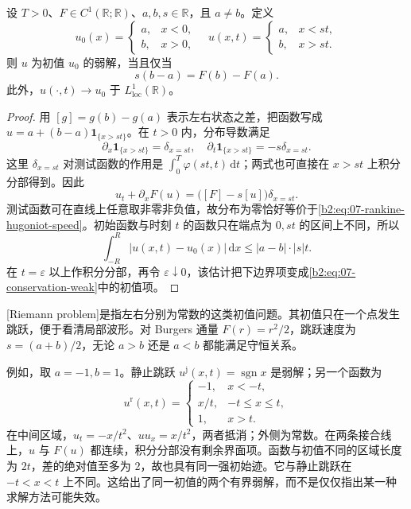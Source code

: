 \begin{proposition}\label{b2:prop:07-rankine-hugoniot}
设 \(T>0\)、\(F\in C^1(\mathbb R;\mathbb R)\)、\(a,b,s\in\mathbb R\)，且 \(a\ne b\)。定义
\[
 u_0(x)=\begin{cases}a,&x<0,\\b,&x>0,\end{cases}
 \quad
 u(x,t)=\begin{cases}a,&x<st,\\b,&x>st.\end{cases}
\]
则 \(u\) 为初值 \(u_0\) 的弱解，当且仅当
\begin{equation}\label{b2:eq:07-rankine-hugoniot-speed}
 s(b-a)=F(b)-F(a).
\end{equation}
此外，\(u(\cdot,t)\to u_0\) 于 \(L^1_{\mathrm{loc}}(\mathbb R)\)。
\end{proposition}
\begin{proof}
用 \([g]=g(b)-g(a)\) 表示左右状态之差，把函数写成
\(u=a+(b-a)\mathbf1_{\{x>st\}}\)。在 \(t>0\) 内，分布导数满足
\[
 \partial_x\mathbf1_{\{x>st\}}=\delta_{x=st},
 \quad
 \partial_t\mathbf1_{\{x>st\}}=-s\delta_{x=st}.
\]
这里 \(\delta_{x=st}\) 对测试函数的作用是 \(\int_0^T\varphi(st,t)\,\mathrm dt\)；两式也可直接在 \(x>st\) 上积分分部得到。因此
\[
 u_t+\partial_xF(u)=\bigl([F]-s[u]\bigr)\delta_{x=st}.
\]
测试函数可在直线上任意取非零非负值，故分布为零恰好等价于\eqref{b2:eq:07-rankine-hugoniot-speed}。初始函数与时刻 \(t\) 的函数只在端点为 \(0,st\) 的区间上不同，所以
\[
 \int_{-R}^R|u(x,t)-u_0(x)|\,\mathrm dx
 \leq |a-b|\cdot|s|t.
\]
在 \(t=\varepsilon\) 以上作积分分部，再令 \(\varepsilon\downarrow0\)，该估计把下边界项变成\eqref{b2:eq:07-conservation-weak}中的初值项。
\end{proof}

[Riemann problem]是指左右分别为常数的这类初值问题。其初值只在一个点发生跳跃，便于看清局部波形。对 Burgers 通量 \(F(r)=r^2/2\)，跳跃速度为
\(s=(a+b)/2\)，无论 \(a>b\) 还是 \(a<b\) 都能满足守恒关系。

例如，取 \(a=-1,b=1\)。静止跳跃
\(u^{\mathrm j}(x,t)=\operatorname{sgn}x\) 是弱解；另一个函数为
\begin{equation}\label{b2:eq:07-burgers-nonunique-fan}
 u^{\mathrm r}(x,t)=
 \begin{cases}
 -1,&x<-t,\\
 x/t,&-t\leq x\leq t,\\
 1,&x>t.
 \end{cases}
\end{equation}
在中间区域，\(u_t=-x/t^2\)、\(u u_x=x/t^2\)，两者抵消；外侧为常数。在两条接合线上，\(u\) 与 \(F(u)\) 都连续，积分分部没有剩余界面项。函数与初值不同的区域长度为 \(2t\)，差的绝对值至多为 \(2\)，故也具有同一强初始迹。它与静止跳跃在 \(-t<x<t\) 上不同。这给出了同一初值的两个有界弱解，而不是仅仅指出某一种求解方法可能失效。


